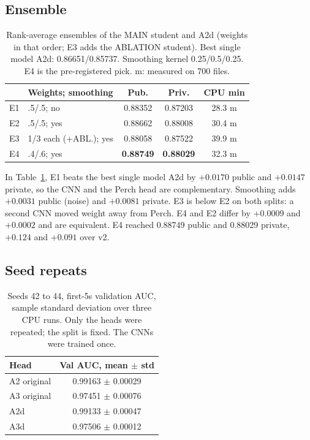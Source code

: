 \documentclass[letterpaper]{article} %
\begin{document}
\subsection{Ensemble}
\begin{table}[t]
\centering
\small
\begin{tabular}{llccc}
\toprule
 & Weights; smoothing & Pub. & Priv. & CPU min \\
\midrule
E1 & .5/.5; no & 0.88352 & 0.87203 & 28.3 m \\
E2 & .5/.5; yes & 0.88662 & 0.88008 & 30.4 m \\
E3 & 1/3 each (+ABL.); yes & 0.88058 & 0.87522 & 39.9 m \\
E4 & .4/.6; yes & \textbf{0.88749} & \textbf{0.88029} & 32.3 m \\
\bottomrule
\end{tabular}
\caption{Rank-average ensembles of the MAIN student and A2d (weights in that order; E3 adds the ABLATION student). Best single model A2d: 0.86651/0.85737. Smoothing kernel 0.25/0.5/0.25. E4 is the pre-registered pick. m: measured on 700 files.}
\label{tab:ens}
\end{table}

In Table~\ref{tab:ens}, E1 beats the best single model A2d by $+0.0170$ public and $+0.0147$ private, so the CNN and the Perch head are complementary. Smoothing adds $+0.0031$ public (noise) and $+0.0081$ private. E3 is below E2 on both splits: a second CNN moved weight away from Perch. E4 and E2 differ by $+0.0009$ and $+0.0002$ and are equivalent. E4 reached 0.88749 public and 0.88029 private, $+0.124$ and $+0.091$ over v2.

\subsection{Seed repeats}
\begin{table}[t]
\centering
\small
\begin{tabular}{lc}
\toprule
Head & Val AUC, mean $\pm$ std \\
\midrule
A2 original & 0.99163 $\pm$ 0.00029 \\
A3 original & 0.97451 $\pm$ 0.00076 \\
A2d & 0.99133 $\pm$ 0.00047 \\
A3d & 0.97506 $\pm$ 0.00012 \\
\bottomrule
\end{tabular}
\caption{Seeds 42 to 44, first-5s validation AUC, sample standard deviation over three CPU runs. Only the heads were repeated; the split is fixed. The CNNs were trained once.}
\label{tab:seed}
\end{table}
\end{document}
